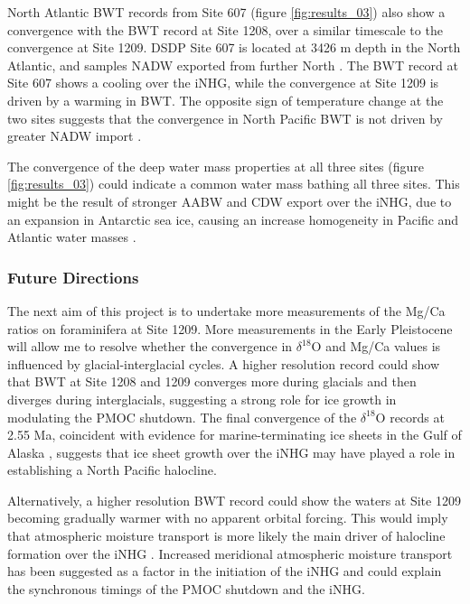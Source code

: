 North Atlantic BWT records from Site 607 (figure \ref{fig:results_03}) also show a convergence with the BWT record at Site 1208, over a similar timescale to the convergence at Site 1209. DSDP Site 607 is located at 3426 m depth in the North Atlantic, and samples NADW exported from further North \citep{ruddimanInitialReportsDeep1987}. The BWT record at Site 607 shows a cooling over the iNHG, while the convergence at Site 1209 is driven by a warming in BWT. The opposite sign of temperature change at the two sites suggests that the convergence in North Pacific BWT is not driven by greater NADW import \citep{kwiekPacificOceanIntermediate1999}. 

The convergence of the deep water mass properties at all three sites (figure \ref{fig:results_03}) could indicate a common water mass bathing all three sites. This might be the result of stronger AABW and CDW export over the iNHG, due to an expansion in Antarctic sea ice, causing an increase homogeneity in Pacific and Atlantic water masses \citep{woodardAntarcticRoleNorthern2014}.

\subsubsection{Future Directions}

The next aim of this project is to undertake more measurements of the Mg/Ca ratios on foraminifera at Site 1209. More measurements in the Early Pleistocene will allow me to resolve whether the convergence in $\delta^{18}\text{O}$ and Mg/Ca values is influenced by glacial-interglacial cycles. A higher resolution record could show that BWT at Site 1208 and 1209 converges more during glacials and then diverges during interglacials, suggesting a strong role for ice growth in modulating the PMOC shutdown. The final convergence of the $\delta^{18}\text{O}$ records at 2.55 Ma, coincident with evidence for marine-terminating ice sheets in the Gulf of Alaska \citep{maslinProgressiveIntensificationNorthern1996}, suggests that ice sheet growth over the iNHG may have played a role in establishing a North Pacific halocline.

Alternatively, a higher resolution BWT record could show the waters at Site 1209 becoming gradually warmer with no apparent orbital forcing. This would imply that atmospheric moisture transport is more likely the main driver of halocline formation over the iNHG \citep{burlsActivePacificMeridional2017}. Increased meridional atmospheric moisture transport has been suggested as a factor in the initiation of the iNHG \citep{brierleyRelativeImportanceMeridional2010} and could explain the synchronous timings of the PMOC shutdown and the iNHG. 

